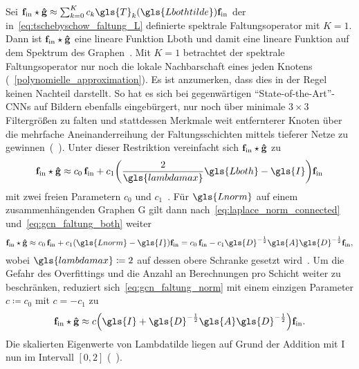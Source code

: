 Sei $\ve{f}_{\mathrm{in}} \star \ve{\hat g} \approx \sum_{k=0}^K c_k \gls{T}_k\left(\gls{Lbothtilde}\right) \ve{f}_{\mathrm{in}}$ der in~\eqref{eq:tschebyschow_faltung_L} definierte spektrale Faltungsoperator mit $K=1$.
Dann ist $\mathbf{f}_{\mathrm{in}} \star \mathbf{\hat g}$ eine lineare Funktion \bzgl{} \gls{Lboth} und damit eine lineare Funktion auf dem Spektrum des Graphen~\cite{gcn}.
Mit $K=1$ betrachtet der spektrale Faltungsoperator nur noch die lokale Nachbarschaft eines jeden Knotens (\vgl{}~\ref{polynomielle_approximation}).
Es ist anzumerken, dass dies in der Regel keinen Nachteil darstellt.
So hat es sich bei gegenwärtigen \enquote{State-of-the-Art}-\glspl{CNN} auf Bildern ebenfalls eingebürgert, nur noch über minimale $3\times3$ Filtergrößen zu falten und stattdessen Merkmale weit entfernterer Knoten über die mehrfache Aneinanderreihung der Faltungsschichten mittels tieferer Netze zu gewinnen~(\vgl{}~\cite{gcn, vgg, He}).
Unter dieser Restriktion vereinfacht sich $\mathbf{f}_{\mathrm{in}} \star \mathbf{\hat g}$ zu
\begin{equation}
  \ve{f}_{\mathrm{in}} \star \ve{\hat g} \approx c_0\, \ve{f}_{\mathrm{in}} + c_1 \left(\frac{2}{\gls{lambdamax}}\gls{Lboth} - \gls{I}\right)\ve{f}_{\mathrm{in}}
  \label{eq:gcn_faltung_both}
\end{equation}
mit zwei freien Parametern $c_0$ und $c_1$~\cite{gcn}.
Für $\gls{Lnorm}$ auf einem zusammenhängenden Graphen \gls{G} gilt dann nach~\eqref{eq:laplace_norm_connected} und~\eqref{eq:gcn_faltung_both} weiter
\begin{equation}
  \ve{f}_{\mathrm{in}} \star \ve{\hat g} \approx c_0 \, \ve{f}_{\mathrm{in}} + c_1 \left(\gls{Lnorm} - \gls{I}\right)\ve{f}_{\mathrm{in}} = c_0 \, \ve{f}_{\mathrm{in}} - c_1 \gls{D}^{-\frac{1}{2}} \gls{A} \gls{D}^{-\frac{1}{2}} \ve{f}_{\mathrm{in}},
  \label{eq:gcn_faltung_norm}
\end{equation}
wobei $\gls{lambdamax} \coloneqq 2$ auf dessen obere Schranke gesetzt wird~\cite{gcn}.
Um die Gefahr des Overfittings und die Anzahl an Berechnungen pro Schicht weiter zu beschränken, reduziert sich~\eqref{eq:gcn_faltung_norm} mit einem einzigen Parameter $c \coloneqq c_0$ mit $c = -c_1$ zu~\cite{gcn}
\begin{equation*}
  \ve{f}_{\mathrm{in}} \star \ve{\hat g} \approx c \left(\gls{I} + \gls{D}^{-\frac{1}{2}} \gls{A} \gls{D}^{-\frac{1}{2}} \right) \ve{f}_{\mathrm{in}}.
\end{equation*}
Die skalierten Eigenwerte von \gls{Lambdatilde} liegen auf Grund der Addition mit \gls{I} nun im Intervall $\left[0, 2\right]$ (\vgl{}~\cite{gcn}).
